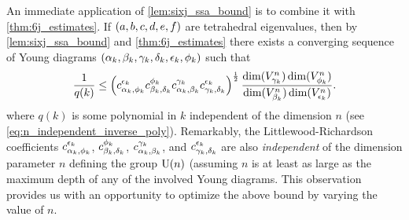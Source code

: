 \documentclass[notitlepage, 11pt, letterpaper]{amsart}
\begin{document}
An immediate application of \cref{lem:sixj_ssa_bound} is to combine it with \cref{thm:6j_estimates}.
If $(a,b,c,d,e,f)$ are tetrahedral eigenvalues, then by \cref{lem:sixj_ssa_bound} and \cref{thm:6j_estimates} there exists a converging sequence of Young diagrams $(\alpha_k, \beta_k, \gamma_k, \delta_k, \epsilon_k, \phi_k)$ such that
\begin{equation}
    \label{eq:combined_bound}
    \frac{1}{q(k)} \leq \left(c_{\alpha_k,\phi_k}^{\epsilon_k}c_{\beta_k,\delta_k}^{\phi_k}c_{\alpha_k,\beta_k}^{\gamma_k}c_{\gamma_k,\delta_k}^{\epsilon_k}\right)^{\frac{1}{2}} \frac{\dim(V_{\gamma_k}^n) \dim(V_{\phi_k}^n)}{\dim(V_{\beta_k}^n) \dim(V_{\epsilon_k}^n)}.
\end{equation}
where $q(k)$ is some polynomial in $k$ independent of the dimension $n$ (see \cref{eq:n_independent_inverse_poly}).
Remarkably, the Littlewood-Richardson coefficients $c_{\alpha_k,\phi_k}^{\epsilon_k}$, $c_{\beta_k,\delta_k}^{\phi_k}$, $c_{\alpha_k,\beta_k}^{\gamma_k}$, and $c_{\gamma_k,\delta_k}^{\epsilon_k}$ are also \textit{independent} of the dimension parameter $n$ defining the group $\operatorname{U}(n)$ (assuming $n$ is at least as large as the maximum depth of any of the involved Young diagrams.
This observation provides us with an opportunity to optimize the above bound by varying the value of $n$.
\end{document}
